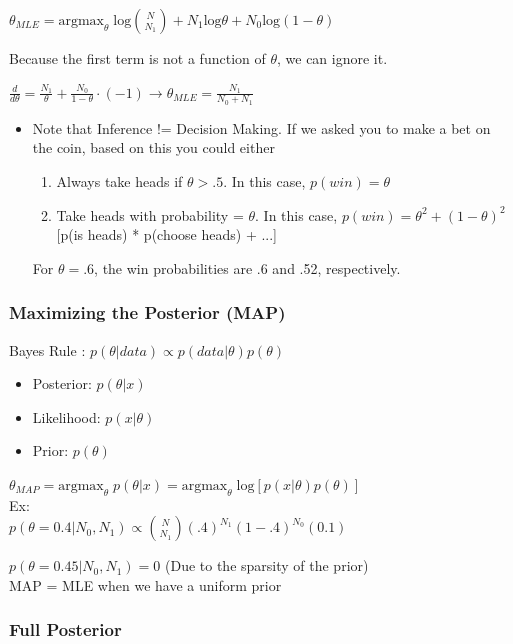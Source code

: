 \documentclass{article}
\begin{document}
$\theta_{MLE} = \textrm{argmax}_{\theta} \;\textrm{log}{N \choose N_1} + N_1 \textrm{log} \theta + N_0  \textrm{log} (1-\theta)$

Because the first term is not a function of $\theta$, we can ignore it.

$\frac{d}{d\theta} = \frac{N_1}{\theta} + \frac{N_0}{1-\theta} \cdot ( -1)  \rightarrow \theta_{MLE} = \frac{N_1}{N_0 + N_1}$

\begin{itemize}
\item Note that Inference != Decision Making. If we asked you to make a bet on the coin, based on this you could either
\begin{enumerate}
\item Always take heads if $\theta > .5$. In this case, $p(win) = \theta$
\item Take heads with probability = $\theta$. In this case, $p(win) = \theta^2 + (1-\theta)^2$ [p(is heads) * p(choose heads) + ...]
\end{enumerate}
For $\theta = .6$, the win probabilities are .6 and .52, respectively. 
\end{itemize}

\subsubsection*{Maximizing the Posterior (MAP)}
Bayes Rule : $p(\theta|data) \propto p(data|\theta) p(\theta)$
\begin{itemize}
\item Posterior: $p(\theta | x)$
\item Likelihood: $p(x | \theta)$
\item Prior: $p(\theta)$
\end{itemize}
$\theta_{MAP} = \textrm{argmax}_{\theta} \; p(\theta | x) = \textrm{argmax}_{\theta}  \;\textrm{log}\left[p(x | \theta) p(\theta)\right]$\\

Ex:\\
$p(\theta=0.4|N_0,N_1) \propto {N \choose N_1} (.4)^{N_1}(1-.4)^{N_0} (0.1)$

$p(\theta=0.45|N_0,N_1) = 0 $ (Due to the sparsity of the prior)\\

MAP = MLE when we have a uniform prior

\subsubsection*{Full Posterior}
\end{document}
